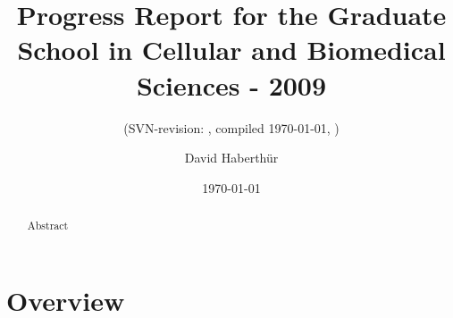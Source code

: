 \documentclass[a4paper,twoside,abstract=true,english,DIV=calc]{scrartcl}
\title{Progress Report for the Graduate School in Cellular and Biomedical Sciences - 2009}
\subtitle{(SVN-revision: \svnkw{LastChangedRevision}, compiled \today, \thistime)}
\author{David Haberthür}
\date{\today}
\begin{document}
\maketitle
{}

\begin{abstract}
Abstract
\end{abstract}

\tableofcontents

\section{Overview}
\lipsum
\end{document}
